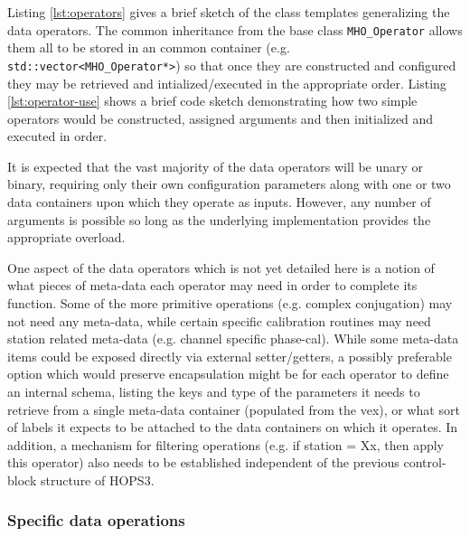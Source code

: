 Listing \ref{lst:operators} gives a brief sketch of the class templates generalizing the data operators. The common inheritance from the base class \texttt{MHO\_Operator} allows them all to be stored in an common container (e.g. \texttt{std::vector<MHO\_Operator*>}) so that once they are
constructed and configured they may be retrieved and intialized/executed in the appropriate order. Listing \ref{lst:operator-use} shows a brief code
sketch demonstrating how two simple operators would be constructed, assigned arguments and then initialized and executed in order.



It is expected that the vast majority of the data operators will be unary or binary, requiring only their own configuration parameters along with one or two data containers upon which they operate as inputs. 
However, any number of arguments is possible so long as the underlying implementation provides the appropriate overload.

One aspect of the data operators which is not yet detailed here is a notion of what pieces of meta-data each operator may need in order to complete its function. 
Some of the more primitive operations (e.g. complex conjugation) may not need any meta-data, while certain 
specific calibration routines may need station related meta-data (e.g. channel specific phase-cal).
While some meta-data items could be exposed directly via external setter/getters, a possibly preferable option which would preserve encapsulation might be for each operator to define an internal schema, 
listing the keys and type of the parameters it needs to retrieve from a single meta-data container (populated from the vex), or what sort of labels it expects to be attached to the data containers on which it operates.
In addition, a mechanism for filtering operations (e.g. if station = Xx, then apply this operator) also needs to be established independent of the previous control-block structure of HOPS3.



\subsubsection{Specific data operations}

